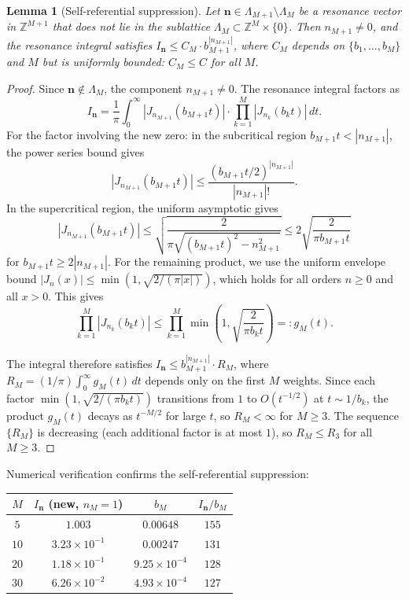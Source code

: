 \documentclass[12pt,reqno]{amsart}
\theoremstyle{plain}
\newtheorem{lemma}[theorem]{Lemma}
\theoremstyle{definition}
\theoremstyle{remark}
\newcommand{\Z}{\mathbb{Z}}
\begin{document}
\begin{lemma}[Self-referential suppression]\label{lem:selfref}
Let $\mathbf{n} \in \Lambda_{M+1} \setminus \Lambda_M$ be a resonance vector in $\Z^{M+1}$ that does not lie in the sublattice $\Lambda_M \subset \Z^M \times \{0\}$.  Then $n_{M+1} \neq 0$, and the resonance integral satisfies $I_{\mathbf{n}} \leq C_M \cdot b_{M+1}^{|n_{M+1}|}$, where $C_M$ depends on $\{b_1,\ldots,b_M\}$ and $M$ but is uniformly bounded: $C_M \leq C$ for all $M$.
\end{lemma}

\begin{proof}
Since $\mathbf{n} \notin \Lambda_M$, the component $n_{M+1} \neq 0$.  The resonance integral factors as
\[
  I_{\mathbf{n}} = \frac{1}{\pi}\int_0^\infty |J_{n_{M+1}}(b_{M+1} t)| \cdot \prod_{k=1}^M |J_{n_k}(b_k t)|\, dt.
\]
For the factor involving the new zero: in the subcritical region $b_{M+1} t < |n_{M+1}|$, the power series bound gives
\[
  |J_{n_{M+1}}(b_{M+1} t)| \leq \frac{(b_{M+1} t / 2)^{|n_{M+1}|}}{|n_{M+1}|!}.
\]
In the supercritical region, the uniform asymptotic gives
\[
  |J_{n_{M+1}}(b_{M+1} t)| \leq \sqrt{\frac{2}{\pi\sqrt{(b_{M+1} t)^2 - n_{M+1}^2}}} \leq 2\sqrt{\frac{2}{\pi b_{M+1} t}}
\]
for $b_{M+1} t \geq 2|n_{M+1}|$.  For the remaining product, we use the uniform envelope bound $|J_n(x)| \leq \min(1, \sqrt{2/(\pi|x|)})$, which holds for all orders $n \geq 0$ and all $x > 0$.  This gives
\[
  \prod_{k=1}^M |J_{n_k}(b_k t)| \leq \prod_{k=1}^M \min\!\left(1, \sqrt{\frac{2}{\pi b_k t}}\right) =: g_M(t).
\]

The integral therefore satisfies $I_{\mathbf{n}} \leq b_{M+1}^{|n_{M+1}|} \cdot R_M$, where $R_M = (1/\pi)\int_0^\infty g_M(t)\, dt$ depends only on the first $M$ weights.  Since each factor $\min(1, \sqrt{2/(\pi b_k t)})$ transitions from $1$ to $O(t^{-1/2})$ at $t \sim 1/b_k$, the product $g_M(t)$ decays as $t^{-M/2}$ for large $t$, so $R_M < \infty$ for $M \geq 3$.  The sequence $\{R_M\}$ is decreasing (each additional factor is at most $1$), so $R_M \leq R_3$ for all $M \geq 3$.
\end{proof}

Numerical verification confirms the self-referential suppression:
\begin{center}
\renewcommand{\arraystretch}{1.1}
\begin{tabular}{cccc}
\toprule
$M$ & $I_{\mathbf{n}}$ (new, $n_M = 1$) & $b_M$ & $I_{\mathbf{n}}/b_M$ \\
\midrule
$5$ & $1.003$ & $0.00648$ & $155$ \\
$10$ & $3.23 \times 10^{-1}$ & $0.00247$ & $131$ \\
$20$ & $1.18 \times 10^{-1}$ & $9.25 \times 10^{-4}$ & $128$ \\
$30$ & $6.26 \times 10^{-2}$ & $4.93 \times 10^{-4}$ & $127$ \\
\bottomrule
\end{tabular}
\end{center}
\end{document}
